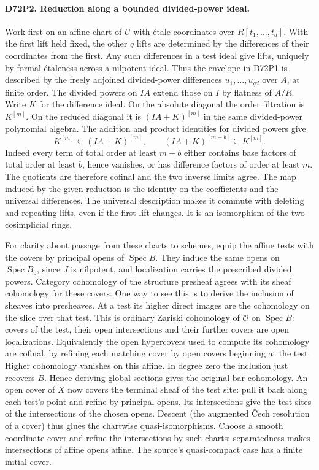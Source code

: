 \paragraph{D72P2. Reduction along a bounded divided-power ideal.}
Work first on an affine chart of $U$ with \'etale coordinates over
$R[t_1,\ldots,t_d]$. With the first lift held fixed, the other $q$
lifts are determined by the differences of their coordinates from
the first. Any such differences in a test ideal give lifts, uniquely
by formal \'etaleness across a nilpotent ideal. Thus the envelope in
D72P1 is described by the freely adjoined divided-power differences
$u_1,\ldots,u_{qd}$ over $A$, at finite order. The divided powers
on $IA$ extend those on $I$ by flatness of $A/R$. Write $K$ for
the difference ideal. On the absolute diagonal the order filtration
is $K^{[m]}$. On the reduced diagonal it is $(IA+K)^{[m]}$ in
the same divided-power polynomial algebra. The addition and product
identities for divided powers give
\[
 K^{[m]}\subseteq(IA+K)^{[m]},\qquad
 (IA+K)^{[m+b]}\subseteq K^{[m]} .
\]
Indeed every term of total order at least $m+b$ either contains
base factors of total order at least $b$, hence vanishes, or has
difference factors of order at least $m$. The quotients are therefore
cofinal and the two inverse limits agree. The map induced by the
given reduction is the identity on the coefficients and the universal
differences. The universal description makes it commute with deleting
and repeating lifts, even if the first lift changes. It is an isomorphism
of the two cosimplicial rings.

For clarity about passage from these charts to schemes, equip the
affine tests with the covers by principal opens of $\operatorname{Spec}B$.
They induce the same opens on $\operatorname{Spec}B_0$, since $J$ is nilpotent,
and localization carries the prescribed divided powers.
Category cohomology of the structure presheaf agrees with its sheaf
cohomology for these covers. One way to see this is to derive the
inclusion of sheaves into presheaves. At a test its higher direct images
are the cohomology on the slice over that test. This is ordinary Zariski
cohomology of $\mathcal O$ on $\operatorname{Spec}B$: covers of
the test, their open intersections and their further covers are
open localizations. Equivalently the open hypercovers used to
compute its cohomology are cofinal, by refining each matching cover
by open covers beginning at the test. Higher cohomology vanishes
on this affine. In degree zero the inclusion just recovers $B$.
Hence deriving global sections gives the original bar cohomology.
An open cover of $X$ now covers the terminal sheaf of the test site:
pull it back along each test's point and refine by principal opens.
Its intersections give the test sites of the intersections of the
chosen opens. Descent (the augmented \v Cech resolution of a cover)
thus glues the chartwise quasi-isomorphisms. Choose a smooth
coordinate cover and refine the intersections by such charts;
separatedness makes intersections of affine opens affine. The
source's quasi-compact case has a finite initial cover.

